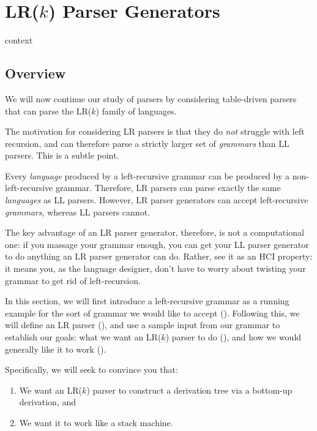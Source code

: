 \chapter{LR($k$) Parser Generators}

\begin{center}
    {context}
\end{center}

\section{Overview}\label{section:lr-overview}
We will now continue our study of parsers by considering table-driven parsers that can parse the LR($k$) family of languages. 

The motivation for considering LR parsers is that they do \textit{not} struggle with left recursion, and can therefore parse a strictly larger set of \textit{grammars} than LL parsers. This is a subtle point. 

Every \textit{language} produced by a left-recursive grammar can be produced by a non-left-recursive grammar. Therefore, LR parsers can parse exactly the same \textit{languages} as LL parsers. However, LR parser generators can accept left-recursive \textit{grammars}, whereas LL parsers cannot. 

The key advantage of an LR parser generator, therefore, is not a computational one: if you massage your grammar enough, you can get your LL parser generator to do anything an LR parser generator can do. Rather, see it as an HCI property: it means you, as the language designer, don't have to worry about twisting your grammar to get rid of left-recursion.

In this section, we will first introduce a left-recursive grammar as a running example for the sort of grammar we would like to accept (). Following this, we will define an LR parser (), and use a sample input from our grammar to establish our goals: what we want an LR($k$) parser to do (), and how we would generally like it to work ().

Specifically, we will seek to convince you that:
\begin{enumerate}
    \item We want an LR($k$) parser to construct a derivation tree via a bottom-up derivation, and
    \item We want it to work like a stack machine.
\end{enumerate}

